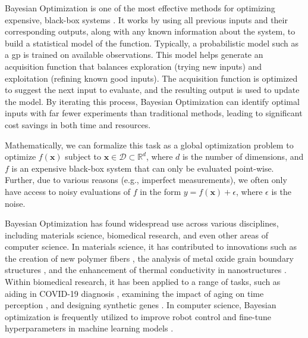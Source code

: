 Bayesian Optimization is one of the most effective methods for optimizing expensive, black-box systems \citep{mockus1978application, streltsov1999non}. It works by using all previous inputs and their corresponding outputs, along with any known information about the system, to build a statistical model of the function. Typically, a probabilistic model such as a \acf{gp} is trained on available observations. This model helps generate an acquisition function that balances exploration (trying new inputs) and exploitation (refining known good inputs). The acquisition function is optimized to suggest the next input to evaluate, and the resulting output is used to update the model. By iterating this process, Bayesian Optimization can identify optimal inputs with far fewer experiments than traditional methods, leading to significant cost savings in both time and resources. 

Mathematically, we can formalize this task as a global optimization problem to optimize $f(\mathbf{x})$ subject to $\mathbf{x} \in \mathcal D \subset \mathbb{R}^d$, where $d$ is the number of dimensions, and $f$ is an expensive black-box system that can only be evaluated point-wise. Further, due to various reasons (e.g., imperfect measurements), we often only have access to noisy evaluations of $f$ in the form $y = f(\mathbf{x}) + \epsilon$, where $\epsilon$ is the noise.

Bayesian Optimization has found widespread use across various disciplines, including materials science, biomedical research, and even other areas of computer science. In materials science, it has contributed to innovations such as the creation of new polymer fibers \citep{li2017rapid}, the analysis of metal oxide grain boundary structures \citep{kikuchi2018bayesian}, and the enhancement of thermal conductivity in nanostructures \citep{ju2017designing}. Within biomedical research, it has been applied to a range of tasks, such as aiding in COVID-19 diagnosis \citep{nour2020novel}, examining the impact of aging on time perception \citep{turgeon2016cognitive}, and designing synthetic genes \citep{gonzalez2015bayesian}. In computer science, Bayesian optimization is frequently utilized to improve robot control \citep{berkenkamp2023bayesian} and fine-tune hyperparameters in machine learning models \citep{snoek2012practical,bergstra2012random}.


